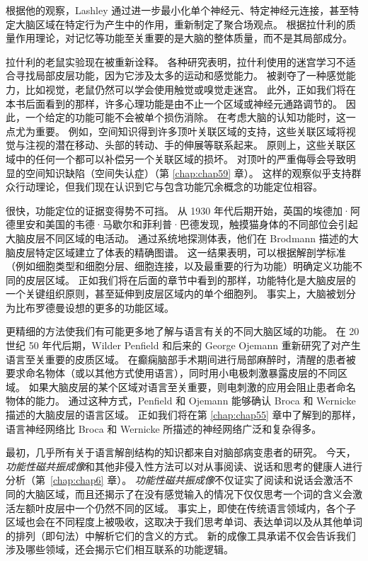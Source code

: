 根据他的观察，Lashley 通过进一步最小化单个神经元、特定神经元连接，甚至特定大脑区域在特定行为产生中的作用，重新制定了聚合场观点。 
根据拉什利的质量作用理论，对记忆等功能至关重要的是大脑的整体质量，而不是其局部成分。


拉什利的老鼠实验现在被重新诠释。 
各种研究表明，拉什利使用的迷宫学习不适合寻找局部皮层功能，因为它涉及太多的运动和感觉能力。 
被剥夺了一种感觉能力，比如视觉，老鼠仍然可以学会使用触觉或嗅觉走迷宫。 
此外，正如我们将在本书后面看到的那样，许多心理功能是由不止一个区域或神经元通路调节的。 
因此，一个给定的功能可能不会被单个损伤消除。 在考虑大脑的认知功能时，这一点尤为重要。 
例如，空间知识得到许多顶叶关联区域的支持，这些关联区域将视觉与注视的潜在移动、头部的转动、手的伸展等联系起来。 
原则上，这些关联区域中的任何一个都可以补偿另一个关联区域的损坏。 
对顶叶的严重侮辱会导致明显的空间知识缺陷（空间失认症）（第 \ref{chap:chap59} 章）。 
这样的观察似乎支持群众行动理论，但我们现在认识到它与包含功能冗余概念的功能定位相容。


很快，功能定位的证据变得势不可挡。 
从 1930 年代后期开始，英国的埃德加·阿德里安和美国的韦德·马歇尔和菲利普·巴德发现，触摸猫身体的不同部位会引起大脑皮层不同区域的电活动。 
通过系统地探测体表，他们在 Brodmann 描述的大脑皮层特定区域建立了体表的精确图谱。 
这一结果表明，可以根据解剖学标准（例如细胞类型和细胞分层、细胞连接，以及最重要的行为功能）明确定义功能不同的皮层区域。 
正如我们将在后面的章节中看到的那样，功能特化是大脑皮层的一个关键组织原则，甚至延伸到皮层区域内的单个细胞列。 
事实上，大脑被划分为比布罗德曼设想的更多的功能区域。


更精细的方法使我们有可能更多地了解与语言有关的不同大脑区域的功能。 
在 20 世纪 50 年代后期，Wilder Penfield 和后来的 George Ojemann 重新研究了对产生语言至关重要的皮质区域。 在癫痫脑部手术期间进行局部麻醉时，清醒的患者被要求命名物体（或以其他方式使用语言），同时用小电极刺激暴露皮层的不同区域。 
如果大脑皮层的某个区域对语言至关重要，则电刺激的应用会阻止患者命名物体的能力。 
通过这种方式，Penfield 和 Ojemann 能够确认 Broca 和 Wernicke 描述的大脑皮层的语言区域。 正如我们将在第 \ref{chap:chap55} 章中了解到的那样，语言神经网络比 Broca 和 Wernicke 所描述的神经网络广泛和复杂得多。


最初，几乎所有关于语言解剖结构的知识都来自对脑部病变患者的研究。 
今天，\textit{功能性磁共振成像}和其他非侵入性方法可以对从事阅读、说话和思考的健康人进行分析（第~\ref{chap:chap6} 章）。 
\textit{功能性磁共振成像}不仅证实了阅读和说话会激活不同的大脑区域，而且还揭示了在没有感觉输入的情况下仅仅思考一个词的含义会激活左额叶皮层中一个仍然不同的区域。 
事实上，即使在传统语言领域内，各个子区域也会在不同程度上被吸收，这取决于我们思考单词、表达单词以及从其他单词的排列（即句法）中解析它们的含义的方式。 
新的成像工具承诺不仅会告诉我们涉及哪些领域，还会揭示它们相互联系的功能逻辑。


